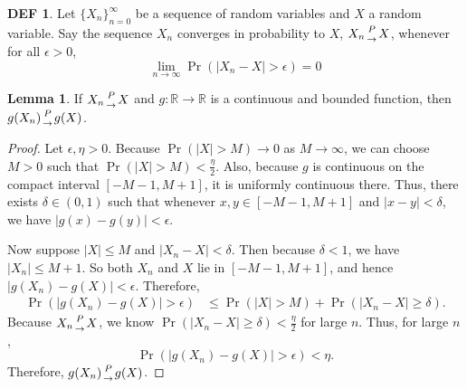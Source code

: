 \documentclass{article}
\theoremstyle{definition}\newtheorem{definition}{DEF}
\theoremstyle{definition}\newtheorem{example}{Ex}
\theoremstyle{lemma}\newtheorem{lemma}{Lemma}
\theoremstyle{corrolary}\newtheorem{corrolary}{Cor}
\begin{document}
\begin{definition}
Let $\{X_n\}_{n=0}^\infty$ be a sequence of random variables and $X$ a random variable.
Say the sequence $X_n$ converges in probability to $X$, $X_n {P \atop \rightarrow} X$, whenever for all $\epsilon >0$,
\begin{equation}
\lim_{n\rightarrow \infty} \Pr(|X_n -X|>\epsilon)=0
\end{equation}
\end{definition}

\begin{lemma}
If $X_n {P \atop \rightarrow} X$ and $g: \mathbb{R} \rightarrow \mathbb{R}$ is a continuous and bounded function, then $g(X_n) {P \atop \rightarrow} g(X)$.
\end{lemma}
\begin{proof}
Let $\epsilon, \eta>0$.
Because $\Pr(|X|>M)\rightarrow 0$ as $M\rightarrow \infty$, we can choose $M>
0$ such that $\Pr(|X|>M)<\frac{\eta}{2}$.
Also, because $g$ is continuous on the compact interval $[-M-1,M+1]$, it is uniformly continuous there.
Thus, there exists $\delta \in (0,1)$ such that whenever $x,y\in [-M-1,M+1]$ 
and $|x-y|<\delta$, we have $|g(x)-g(y)|<\epsilon$.

Now suppose $|X|\leq M$ and $|X_n-X|<\delta$.
Then because $\delta<1$, we have $|X_n|\leq M+1$.
So both $X_n$ and $X$ lie in $[-M-1,M+1]$, and hence $|g(X_n)-g(X)|<\epsilon$.
Therefore,
\begin{align*}
\Pr(|g(X_n)-g(X)|>\epsilon)
&\leq \Pr(|X|>M)+\Pr(|X_n-X|\geq \delta).
\end{align*}
Because $X_n {P \atop \rightarrow} X$, we know $\Pr(|X_n-X|\geq \delta)<\frac{\eta}{2}$ for large $n$.
Thus, for large $n$,
\begin{equation*}
\Pr(|g(X_n)-g(X)|>\epsilon)<\eta.
\end{equation*}
Therefore, $g(X_n) {P \atop \rightarrow} g(X)$.
\end{proof}
\end{document}
